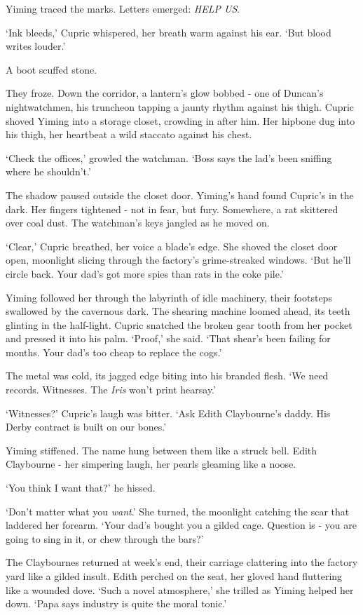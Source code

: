 Yiming traced the marks. Letters emerged: \textit{HELP US}.

`Ink bleeds,' Cupric whispered, her breath warm against his ear. `But blood writes louder.'

A boot scuffed stone.

They froze. Down the corridor, a lantern's glow bobbed - one of Duncan's nightwatchmen, his truncheon tapping a jaunty rhythm against his thigh. Cupric shoved Yiming into a storage closet, crowding in after him. Her hipbone dug into his thigh, her heartbeat a wild staccato against his chest.

`Check the offices,' growled the watchman. `Boss says the lad's been sniffing where he shouldn't.'

The shadow paused outside the closet door. Yiming's hand found Cupric's in the dark. Her fingers tightened - not in fear, but fury. Somewhere, a rat skittered over coal dust. The watchman's keys jangled as he moved on.

`Clear,' Cupric breathed, her voice a blade's edge. She shoved the closet door open, moonlight slicing through the factory's grime-streaked windows. `But he'll circle back. Your dad's got more spies than rats in the coke pile.'

Yiming followed her through the labyrinth of idle machinery, their footsteps swallowed by the cavernous dark. The shearing machine loomed ahead, its teeth glinting in the half-light. Cupric snatched the broken gear tooth from her pocket and pressed it into his palm. `Proof,' she said. `That shear's been failing for months. Your dad's too cheap to replace the cogs.'

The metal was cold, its jagged edge biting into his branded flesh. `We need records. Witnesses. The \textit{Iris} won't print hearsay.'

`Witnesses?' Cupric's laugh was bitter. `Ask Edith Claybourne's daddy. His Derby contract is built on our bones.'

Yiming stiffened. The name hung between them like a struck bell. Edith Claybourne - her simpering laugh, her pearls gleaming like a noose.

`You think I want that?' he hissed.

`Don't matter what you \textit{want}.' She turned, the moonlight catching the scar that laddered her forearm. `Your dad's bought you a gilded cage. Question is - you are going to sing in it, or chew through the bars?'

The Claybournes returned at week's end, their carriage clattering into the factory yard like a gilded insult. Edith perched on the seat, her gloved hand fluttering like a wounded dove. `Such a novel atmosphere,' she trilled as Yiming helped her down. `Papa says industry is quite the moral tonic.'

